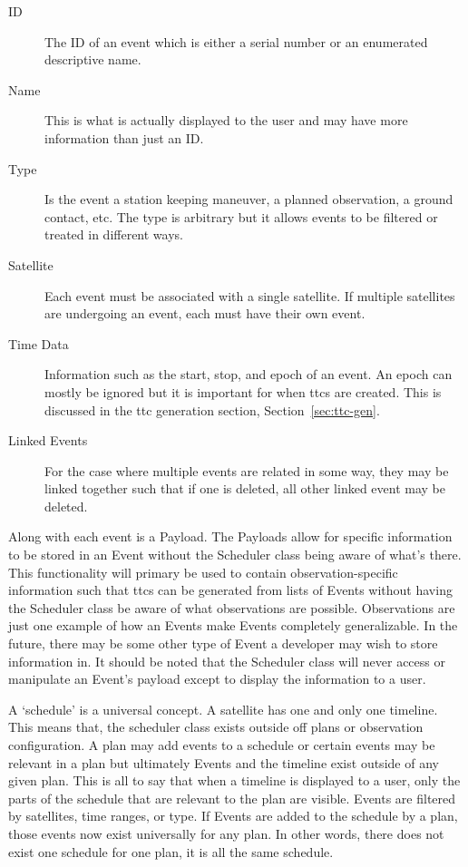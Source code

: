 \begin{description} 

    \item[ID] The ID of an event which is either a serial number or an
	enumerated descriptive name.

    \item[Name] This is what is actually displayed to the user and may have
	more information than just an ID.

    \item[Type] Is the event a station keeping maneuver, a planned observation,
	a ground contact, etc. The type is arbitrary but it allows events to be
	filtered or treated in different ways.

    \item[Satellite] Each event must be associated with a single satellite. If
	multiple satellites are undergoing an event, each must have their own
	event.

    \item[Time Data] Information such as the start, stop, and epoch of an
	event. An epoch can mostly be ignored but it is important for when
	\glspl{ttc} are created. This is discussed in the \gls{ttc} generation
	section, Section~\ref{sec:ttc-gen}.

    \item[Linked Events] For the case where multiple events are related in some
	way, they may be linked together such that if one is deleted, all other
	linked event may be deleted.

\end{description} 

Along with each event is a Payload. The Payloads allow for specific information
to be stored in an Event without the Scheduler class being aware of what's
there. This functionality will primary be used to contain observation-specific
information such that \glspl{ttc} can be generated from lists of Events without
having the Scheduler class be aware of what observations are possible.
Observations are just one example of how an Events make Events completely
generalizable. In the future, there may be some other type of Event a developer
may wish to store information in. It should be noted that the Scheduler class
will never access or manipulate an Event's payload except to display the
information to a user.

A `schedule' is a universal concept. A satellite has one and only one timeline.
This means that, the scheduler class exists outside off plans or observation
configuration. A plan may add events to a schedule or certain events may be
relevant in a plan but ultimately Events and the timeline exist outside of any
given plan. This is all to say that when a timeline is displayed to a user,
only the parts of the schedule that are relevant to the plan are visible.
Events are filtered by satellites, time ranges, or type. If Events are added to
the schedule by a plan, those events now exist universally for any plan. In
other words, there does not exist one schedule for one plan, it is all the same
schedule.

